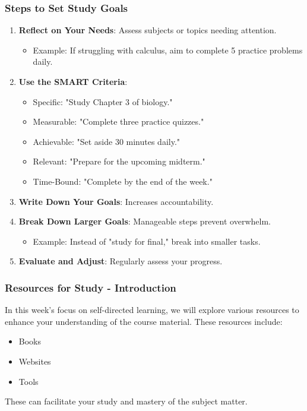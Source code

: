 \documentclass[aspectratio=169]{beamer}
\begin{document}
\begin{frame}[fragile]
    \frametitle{Steps to Set Study Goals}
    \begin{enumerate}
        \item \textbf{Reflect on Your Needs}: Assess subjects or topics needing attention.
            \begin{itemize}
                \item Example: If struggling with calculus, aim to complete 5 practice problems daily.
            \end{itemize}
        \item \textbf{Use the SMART Criteria}:
            \begin{itemize}
                \item Specific: "Study Chapter 3 of biology."
                \item Measurable: "Complete three practice quizzes."
                \item Achievable: "Set aside 30 minutes daily."
                \item Relevant: "Prepare for the upcoming midterm."
                \item Time-Bound: "Complete by the end of the week."
            \end{itemize}
        \item \textbf{Write Down Your Goals}: Increases accountability.
        \item \textbf{Break Down Larger Goals}: Manageable steps prevent overwhelm.
            \begin{itemize}
                \item Example: Instead of "study for final," break into smaller tasks.
            \end{itemize}
        \item \textbf{Evaluate and Adjust}: Regularly assess your progress.
    \end{enumerate}
\end{frame}

\begin{frame}[fragile]
    \frametitle{Resources for Study - Introduction}
    In this week’s focus on self-directed learning, we will explore various resources to enhance your understanding of the course material. These resources include:
    \begin{itemize}
        \item Books
        \item Websites
        \item Tools
    \end{itemize}
    These can facilitate your study and mastery of the subject matter.
\end{frame}
\end{document}
